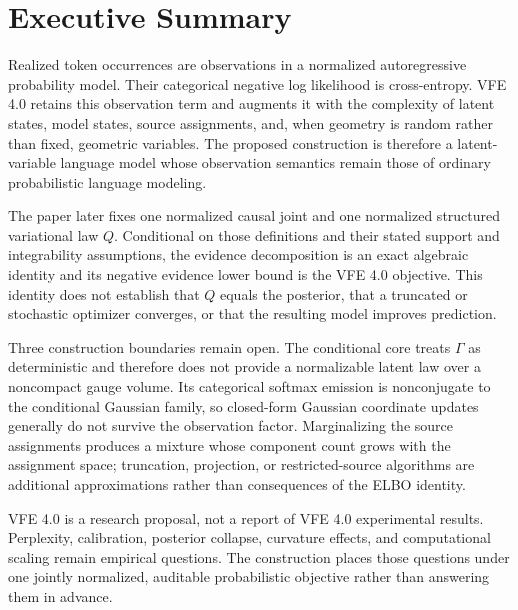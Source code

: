 \chapter*{Executive Summary}

Realized token occurrences are observations in a normalized autoregressive probability model. Their categorical negative log likelihood is cross-entropy. VFE 4.0 retains this observation term and augments it with the complexity of latent states, model states, source assignments, and, when geometry is random rather than fixed, geometric variables. The proposed construction is therefore a latent-variable language model whose observation semantics remain those of ordinary probabilistic language modeling.

The paper later fixes one normalized causal joint and one normalized structured variational law $Q$. Conditional on those definitions and their stated support and integrability assumptions, the evidence decomposition is an exact algebraic identity and its negative evidence lower bound is the VFE 4.0 objective. This identity does not establish that $Q$ equals the posterior, that a truncated or stochastic optimizer converges, or that the resulting model improves prediction.

Three construction boundaries remain open. The conditional core treats $\Gamma$ as deterministic and therefore does not provide a normalizable latent law over a noncompact gauge volume. Its categorical softmax emission is nonconjugate to the conditional Gaussian family, so closed-form Gaussian coordinate updates generally do not survive the observation factor. Marginalizing the source assignments produces a mixture whose component count grows with the assignment space; truncation, projection, or restricted-source algorithms are additional approximations rather than consequences of the ELBO identity.

VFE 4.0 is a research proposal, not a report of VFE 4.0 experimental results. Perplexity, calibration, posterior collapse, curvature effects, and computational scaling remain empirical questions. The construction places those questions under one jointly normalized, auditable probabilistic objective rather than answering them in advance.

